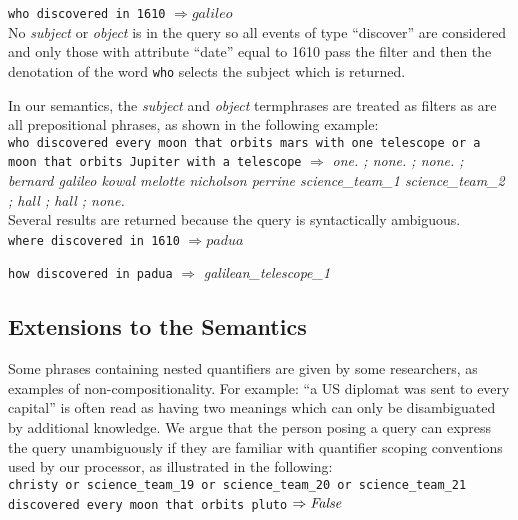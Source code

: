 \documentclass[../main.tex]{subfiles}
\begin{document}
\begin{refsection}
\noindent \texttt{who discovered in 1610} $\Rightarrow \mathit{galileo}$ \\

No \textit{subject} or \textit{object} is in the query so all events of type ``discover'' are considered and only those with attribute ``date'' equal to 1610 pass the filter and then the denotation of the word \texttt{who} selects the subject which is returned.

In our semantics, the \textit{subject} and \textit{object} termphrases are treated as filters as are all prepositional phrases, as shown in the following example: \\

\noindent \texttt{who discovered every moon that orbits mars with one telescope or a \\ moon that orbits Jupiter with a telescope} $\Rightarrow$ \textit{one. ; none. ; none. ; bernard galileo kowal melotte nicholson perrine science\_team\_1 science\_team\_2 ; hall ; hall ; none.} \\

Several results are returned because the query is syntactically ambiguous. \\

\noindent \texttt{where discovered in 1610} $\Rightarrow \mathit{padua}$

\noindent \texttt{how discovered in padua} $\Rightarrow$ \textit{galilean\_telescope\_1}

\subsection{Extensions to the Semantics}
\label{webist2019conf:extend}

Some phrases containing nested quantifiers are given by some researchers, as examples of non-compositionality. For example: ``a US diplomat was sent to every capital'' is often read as having two meanings which can only be disambiguated by additional knowledge. We argue that the person posing a query can express the query unambiguously if they are familiar with quantifier scoping conventions used by our processor, as illustrated in the following: \\

\noindent \texttt{christy or science\_team\_19 or science\_team\_20 or science\_team\_21 \\ discovered every moon that orbits pluto} $\Rightarrow \mathit{False}$ \\


\end{refsection}
\end{document}
